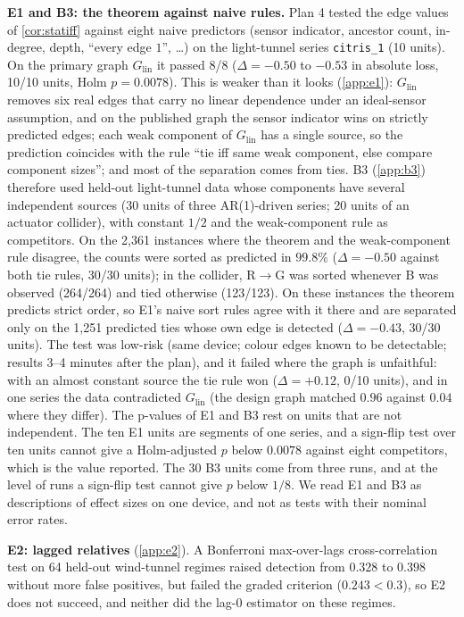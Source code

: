 \documentclass[pdflatex,sn-apa]{sn-jnl}
\theoremstyle{thmstyleone}
\theoremstyle{thmstylethree}
\theoremstyle{thmstyletwo}
\begin{document}
\textbf{E1 and B3: the theorem against naive rules.} Plan 4 tested the edge
values of \cref{cor:statiff} against eight naive predictors (sensor
indicator, ancestor count, in-degree, depth, ``every edge $1$'', \dots) on the
light-tunnel series \texttt{citris\_1} (10 units). On the primary graph
$G_{\mathrm{lin}}$ it passed 8/8 ($\Delta=-0.50$ to $-0.53$ in absolute loss,
10/10 units, Holm $p=0.0078$). This is weaker than it looks
(\cref{app:e1}): $G_{\mathrm{lin}}$ removes six real edges that carry no linear
dependence under an ideal-sensor assumption, and on the published graph the
sensor indicator wins on strictly predicted edges; each weak component of
$G_{\mathrm{lin}}$ has a single source, so the prediction coincides with the
rule ``tie iff same weak component, else compare component sizes''; and most
of the separation comes from ties. B3 (\cref{app:b3}) therefore used held-out
light-tunnel data whose components have several independent sources (30
units of three AR(1)-driven series; 20 units of an actuator collider), with
constant $1/2$ and the weak-component rule as competitors. On the 2{,}361
instances where the theorem and the weak-component rule disagree, the counts
were sorted as predicted in $99.8\%$ ($\Delta=-0.50$ against both tie rules,
30/30 units); in the collider, R$\to$G was sorted whenever B was observed
(264/264) and tied otherwise (123/123). On these instances the theorem
predicts strict order, so E1's naive sort rules agree with it there and are
separated only on the 1{,}251 predicted ties whose own edge is detected
($\Delta=-0.43$, 30/30 units). The test was low-risk (same device; colour edges
known to be detectable; results 3--4 minutes after the plan), and it failed
where the graph is unfaithful: with an almost constant source the tie rule won
($\Delta=+0.12$, 0/10 units), and in one series the data contradicted
$G_{\mathrm{lin}}$ (the design graph matched $0.96$ against $0.04$ where they
differ). The p-values of E1 and B3 rest on units that are not independent. The
ten E1 units are segments of one series, and a sign-flip test over ten units
cannot give a Holm-adjusted $p$ below $0.0078$ against eight competitors, which
is the value reported. The 30 B3 units come from three runs, and at the level of
runs a sign-flip test cannot give $p$ below $1/8$. We read E1 and B3 as
descriptions of effect sizes on one device, and not as tests with their nominal
error rates.

\textbf{E2: lagged relatives} (\cref{app:e2}). A Bonferroni max-over-lags
cross-correlation test \citep{haugh1976checking} on 64 held-out wind-tunnel
regimes raised detection from $0.328$ to $0.398$ without more false
positives, but failed the graded criterion ($0.243<0.3$), so E2 does not
succeed, and neither did the lag-0 estimator on these regimes.
\end{document}
